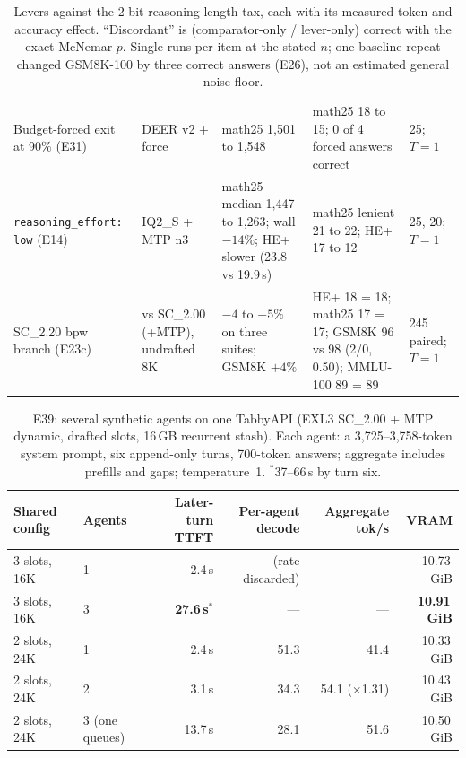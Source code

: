 \documentclass[11pt]{article}
\newcommand{\q}[1]{\texttt{#1}}
\begin{document}
\begin{table}[htbp]
\begin{tabular}{L{3.3cm}L{2.6cm}L{3.1cm}L{4.4cm}L{2.0cm}}
Budget-forced exit at 90\% (E31) & DEER v2 + force & math25 1,501 to 1,548 & math25 18 to 15; 0 of 4 forced answers correct & 25; $T{=}1$ \\
\q{reasoning\_effort: low} (E14) & IQ2\_S + MTP n3 & math25 median 1,447 to 1,263; wall $-14\%$; HE+ slower (23.8 vs 19.9\,s) & math25 lenient 21 to 22; HE+ 17 to 12 & 25, 20; $T{=}1$ \\
SC\_2.20 bpw branch (E23c) & vs SC\_2.00 (+MTP), undrafted 8K & $-4$ to $-5\%$ on three suites; GSM8K $+4\%$ & HE+ 18 = 18; math25 17 = 17; GSM8K 96 vs 98 (2/0, 0.50); MMLU-100 89 = 89 & 245 paired; $T{=}1$ \\
\bottomrule
\end{tabular}
\caption{Levers against the 2-bit reasoning-length tax, each with its measured
token and accuracy effect. ``Discordant'' is (comparator-only / lever-only)
correct with the exact McNemar $p$. Single runs per item at the stated $n$;
one baseline repeat changed GSM8K-100 by three correct answers (E26), not
an estimated general noise floor.}
\label{tab:levers}
\end{table}

\begin{table}[htbp]
\centering
\scriptsize
\begin{tabular}{llrrrr}
\toprule
Shared config & Agents & Later-turn TTFT & Per-agent decode & Aggregate tok/s & VRAM \\
\midrule
3 slots, 16K & 1 & 2.4\,s & (rate discarded) & --- & 10.73\,GiB \\
3 slots, 16K & 3 & \textbf{27.6\,s}$^{*}$ & --- & --- & \textbf{10.91\,GiB} \\
2 slots, 24K & 1 & 2.4\,s & 51.3 & 41.4 & 10.33\,GiB \\
2 slots, 24K & 2 & 3.1\,s & 34.3 & 54.1 ($\times$1.31) & 10.43\,GiB \\
2 slots, 24K & 3 (one queues) & 13.7\,s & 28.1 & 51.6 & 10.50\,GiB \\
\bottomrule
\end{tabular}
\caption{E39: several synthetic agents on one TabbyAPI (EXL3 SC\_2.00 + MTP
dynamic, drafted slots, 16\,GB recurrent stash). Each agent: a
3,725--3,758-token system prompt, six append-only turns, 700-token answers;
aggregate includes prefills and gaps; temperature~1. $^{*}$37--66\,s by turn
six.}
\label{tab:agents}
\end{table}
\end{document}
